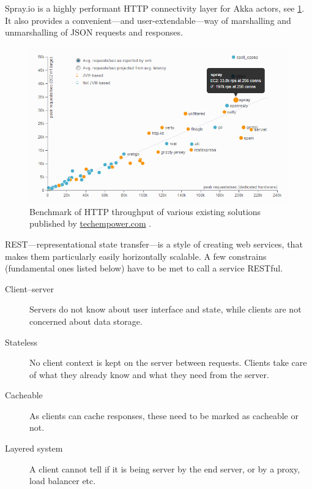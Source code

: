 Spray.io is a highly performant HTTP connectivity layer for Akka actors, see \cref{fig:spray-benchmark}. It also provides a convenient---and user-extendable---way of marshalling and unmarshalling of JSON requests and responses.

\begin{figure}[h]
	\centering
	\includegraphics[width=\textwidth]{graphics-spray-benchmark}
	\caption{Benchmark of HTTP throughput of various existing solutions published by \href{http://www.techempower.com}{techempower.com} \cite{Spray:2013:Benchmark}.}
	\label{fig:spray-benchmark}
\end{figure}

REST---representational state transfer---is a style of creating web services, that makes them particularly easily horizontally scalable. A few constrains (fundamental ones listed below) have to be met to call a service RESTful.

\begin{description}
	\item[Client--server] Servers do not know about user interface and state, while clients are not concerned about data storage.
	\item[Stateless] No client context is kept on the server between requests. Clients take care of what they already know and what they need from the server.
	\item[Cacheable] As clients can cache responses, these need to be marked as cacheable or not.
	\item[Layered system] A client cannot tell if it is being server by the end server, or by a proxy, load balancer etc.
\end{description}
